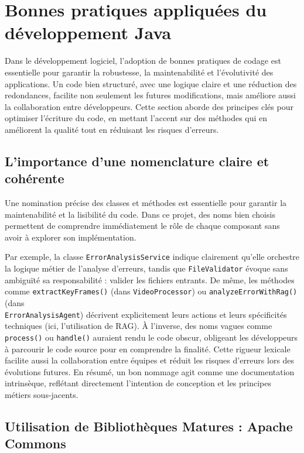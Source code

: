 \documentclass[12pt,a4paper]{report}
\begin{document}
	\section{Bonnes pratiques appliquées du développement Java}
	
	Dans le développement logiciel, l'adoption de bonnes pratiques de codage est essentielle pour garantir la robustesse, la maintenabilité et l'évolutivité des applications. Un code bien structuré, avec une logique claire et une réduction des redondances, facilite non seulement les futures modifications, mais améliore aussi la collaboration entre développeurs. Cette section aborde des principes clés pour optimiser l'écriture du code, en mettant l'accent sur des méthodes qui en améliorent la qualité tout en réduisant les risques d'erreurs.
	
	\subsection{L'importance d'une nomenclature claire et cohérente}
	
	Une nomination précise des classes et méthodes est essentielle pour garantir la maintenabilité et la lisibilité du code. Dans ce projet, des noms bien choisis permettent de comprendre immédiatement le rôle de chaque composant sans avoir à explorer son implémentation.
	
	Par exemple, la classe \verb|ErrorAnalysisService| indique clairement qu'elle orchestre la logique métier de l'analyse d'erreurs, tandis que \verb|FileValidator| évoque sans ambiguïté sa responsabilité : valider les fichiers entrants. De même, les méthodes comme \verb|extractKeyFrames()| (dans \verb|VideoProcessor|) ou \verb|analyzeErrorWithRag()| (dans \\ \verb|ErrorAnalysisAgent|) décrivent explicitement leurs actions et leurs spécificités techniques (ici, l'utilisation de RAG). À l'inverse, des noms vagues comme \verb|process()| ou \verb|handle()| auraient rendu le code obscur, obligeant les développeurs à parcourir le code source pour en comprendre la finalité. Cette rigueur lexicale facilite aussi la collaboration entre équipes et réduit les risques d'erreurs lors des évolutions futures. En résumé, un bon nommage agit comme une documentation intrinsèque, reflétant directement l’intention de conception et les principes métiers sous-jacents.
	
	
	
	\subsection{Utilisation de Bibliothèques Matures : Apache Commons}
	
\end{document}
